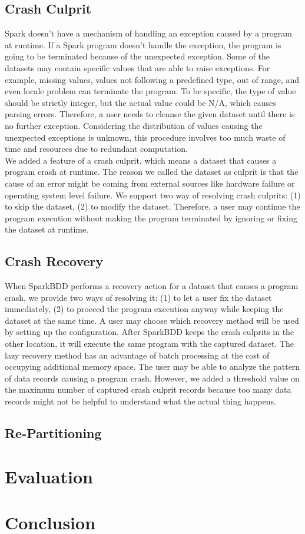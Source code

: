 \documentclass{acm_proc_article-sp}
\begin{document}
\subsection{Crash Culprit}

Spark doesn't have a mechanism of handling an exception caused by a program at runtime. If a Spark program doesn't handle the exception, the program is going to be terminated because of the unexpected exception. Some of the datasets may contain specific values that are able to raise exceptions. For example, missing values, values not following a predefined type, out of range, and even locale problem can terminate the program. To be specific, the type of value should be strictly integer, but the actual value could be N/A, which causes parsing errors. Therefore, a user needs to cleanse the given dataset until there is no further exception. Considering the distribution of values causing the unexpected exceptions is unknown, this procedure involves too much waste of time and resources due to redundant computation.\\
We added a feature of a crash culprit, which means a dataset that causes a program crash at runtime. The reason we called the dataset as culprit is that the cause of an error might be coming from external sources like hardware failure or operating system level failure. We support two way of resolving crash culprits: (1) to skip the dataset, (2) to modify the dataset. Therefore, a user may continue the program execution without making the program terminated by ignoring or fixing the dataset at runtime.

\subsection{Crash Recovery}

When SparkBDD performs a recovery action for a dataset that causes a program crash, we provide two ways of resolving it: (1) to let a user fix the dataset immediately, (2) to proceed the program execution anyway while keeping the dataset at the same time. A user may choose which recovery method will be used by setting up the configuration. After SparkBDD keeps the crash culprits in the other location, it will execute the same program with the captured dataset. The lazy recovery method has an advantage of batch processing at the cost of occupying additional memory space. The user may be able to analyze the pattern of data records causing a program crash. However, we added a threshold value on the maximum number of captured crash culprit records because too many data records might not be helpful to understand what the actual thing happens.

\subsection{Re-Partitioning}

\section{Evaluation}
\section{Conclusion}


  
\balancecolumns
\end{document}
